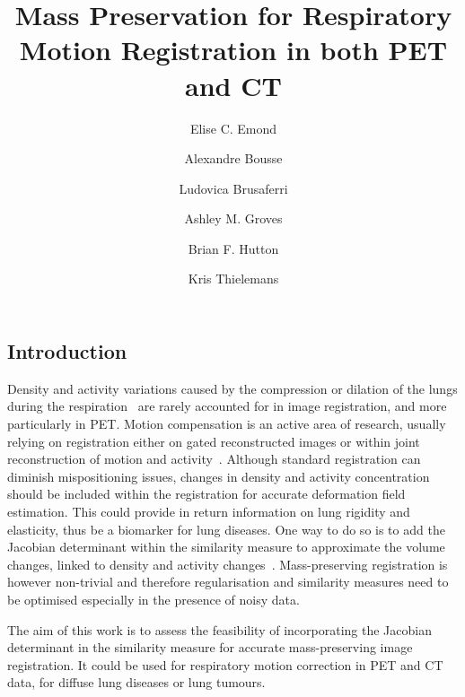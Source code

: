 \documentclass[portrait,color=UCLrichred,margin=3cm]{uclposter}
\title{Mass Preservation for Respiratory Motion Registration in both PET and CT}
\author[1 *]{Elise C. Emond}
\author[1,2]{Alexandre Bousse}
\author[1]{Ludovica Brusaferri}
\author[1]{Ashley M. Groves}
\author[1]{Brian F. Hutton}
\author[1]{Kris Thielemans}
\affil[1]{INM, University College London, UK}
\affil[2]{LaTIM,
Universit\'e de Bretagne Occidentale, France}
\affil[*]{elise.emond.16@ucl.ac.uk}
\begin{document}
\maketitle

\begin{multicols}{4}

\section*{Introduction}
Density and activity variations caused by the compression or dilation of the lungs during the respiration~\cite{Simon2000,Cuplov2018} are rarely accounted for in image registration, and more particularly in PET.
Motion compensation is an active area of research, usually relying on registration either on gated reconstructed images or within joint reconstruction of motion and activity~\cite{Pepin2014}.
Although standard registration can diminish mispositioning issues, changes in density and activity concentration should be included within the registration for accurate deformation field estimation. This could provide in return information on lung rigidity and elasticity, thus be a biomarker for lung diseases.
One way to do so is to add the Jacobian determinant within the similarity measure to approximate the volume changes, linked to density and activity changes~\cite{Reinhardt2008,Thielemans2009,Gigengack2012}. Mass-preserving registration is however non-trivial and therefore regularisation and similarity measures need to be optimised especially in the presence of noisy data. 

The aim of this work is to assess the feasibility of incorporating the Jacobian determinant in the similarity measure for accurate mass-preserving image registration. It could be used for respiratory motion correction in PET and CT data, \eg for diffuse lung diseases or lung tumours.





\end{multicols}
\end{document}
